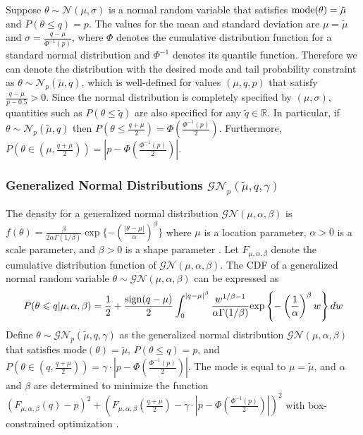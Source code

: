 \documentclass[useAMS,usenatbib,referee]{biom}
\begin{document}
Suppose $\theta\sim\mathcal{N}(\mu,\sigma)$ is a normal random variable that satisfies ${\mathrm{mode}}(\theta)=\tilde{\mu}$ and $P(\theta\leq q)=p$. The values for the mean and standard deviation are $\mu=\tilde{\mu}$ and $\sigma=\frac{q-\mu}{\Phi^{-1}(p)}$, where $\Phi$ denotes the cumulative distribution function for a standard normal distribution and $\Phi^{-1}$ denotes its quantile function. Therefore we can denote the distribution with the desired mode and tail probability constraint as  $\theta\sim\mathcal{N}_p(\tilde{\mu},q)$, which is well-defined for values $(\mu,q,p)$ that satisfy $\frac{q-\mu}{p-0.5}>0$. Since the normal distribution is completely specified by $(\mu, \sigma)$, quantities such as $P(\theta\leq\tilde{q})$ are also specified for any $\tilde{q}\in\mathbb{R}$. In particular, if $\theta\sim\mathcal{N}_p(\tilde{\mu},q)$ then $P(\theta\leq\frac{q+\mu}{2})=\Phi(\frac{\Phi^{-1}(p)}{2})$. Furthermore, $P(\theta\in(\mu,\frac{q+\mu}{2}))=|p-\Phi(\frac{\Phi^{-1}(p)}{2})|$. 

\subsubsection{Generalized Normal Distributions $\mathcal{GN}_p(\tilde{\mu},q,\gamma)$}
The density for a generalized normal distribution $\mathcal{GN}(\mu,\alpha,\beta)$ is
$
f(\theta)=\frac{\beta}{2\alpha\Gamma(1/\beta)}\exp\{-(\frac{|\theta-\mu|}{\alpha})^\beta\}
$ where $\mu$ is a location parameter, $\alpha>0$ is a scale parameter, and $\beta>0$ is a shape parameter \citep{Nadarajah2005}. Let $F_{\mu,\alpha,\beta}$ denote the cumulative distribution function of $\mathcal{GN}(\mu,\alpha,\beta)$. The CDF of a generalized normal random variable $\theta\sim\mathcal{GN}(\mu,\alpha,\beta)$ can be expressed as \citep{Griffin2018}
\begin{equation}
P(\theta\leqslant q|\mu,\alpha,\beta)=\frac{1}{2}+\frac{{\mathrm{sign}}(q-\mu)}{2}\int_0^{|q-\mu|^\beta}\frac{w^{1/\beta-1}}{\alpha\Gamma(1/\beta)}{\mathrm{exp}}\left\{-\left(\frac{1}{\alpha}\right)^\beta w\right\} dw
\end{equation}
Define $\theta\sim\mathcal{GN}_p(\tilde{\mu},q,\gamma)$ as the generalized normal distribution $\mathcal{GN}(\mu,\alpha,\beta)$ that satisfies mode$(\theta)=\tilde{\mu}$, $P(\theta\leq q)=p$, and $P(\theta\in(q,\frac{q+\mu}{2}))=\gamma\cdot|p-\Phi(\frac{\Phi^{-1}(p)}{2})|$.
%
The mode is equal to $\mu=\tilde{\mu}$, and $\alpha$ and $\beta$ are determined to minimize the function $(F_{\mu,\alpha,\beta}(q)-p)^2+(F_{\mu,\alpha,\beta}(\frac{q+\mu}{2})-\gamma\cdot|p-\Phi(\frac{\Phi^{-1}(p)}{2})|)^2$ with box-constrained optimization \citep{Byrd1995}. %
\end{document}
